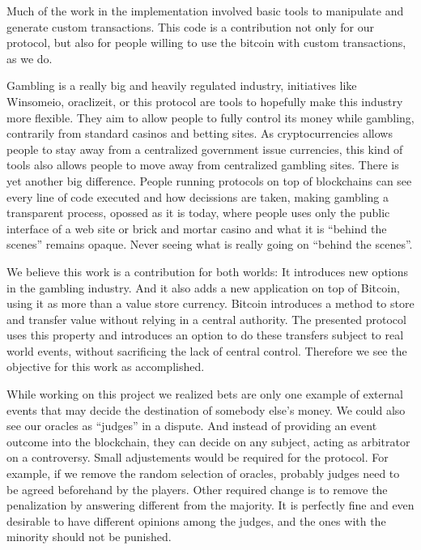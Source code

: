 Much of the work in the implementation involved basic tools to manipulate and
  generate custom transactions.
This code is a contribution not only for our protocol, but also for people
  willing to use the bitcoin with custom transactions, as we do.

Gambling is a really big and heavily regulated industry, initiatives like
  Winsomeio, oraclizeit, or this protocol are tools to hopefully  make this
  industry more flexible.
They aim to allow people to fully control its money while gambling, contrarily
  from standard casinos and betting sites.
As cryptocurrencies allows people to stay away from a centralized government
  issue currencies, this kind of tools also allows people to move away from
  centralized gambling sites.
There is yet another big difference.
People running protocols on top of blockchains can see every line of code
  executed and how decissions are taken, making gambling a transparent process,
  opossed as it is today, where people uses only the public interface of a web
  site or brick and mortar casino and what it is ``behind the scenes'' remains
  opaque.
Never seeing what is really going on ``behind the scenes''.

We believe this work is a contribution for both worlds: It introduces new
  options in the gambling industry. And it also adds a new application on top of
  Bitcoin, using it as more than a value store currency.
Bitcoin introduces a method to store and transfer value without relying in a
  central authority.
The presented protocol uses this property and introduces an option to do
  these transfers subject to real world events, without sacrificing the lack
  of central control.
Therefore we see the objective for this work as accomplished.

While working on this project we realized bets are only one example of external
  events that may decide the destination of somebody else's money.
We could also see our oracles as ``judges'' in a dispute.
And instead of providing an event outcome into the blockchain, they can
  decide on any subject, acting as arbitrator on a controversy.
Small adjustements would be required for the protocol.
For example, if we remove the random selection of oracles, probably judges need
  to be agreed beforehand by the players.
Other required change is to remove the penalization by answering different
  from the majority.
It is perfectly fine and even desirable to have different opinions among the
  judges, and the ones with the minority should not be punished.


